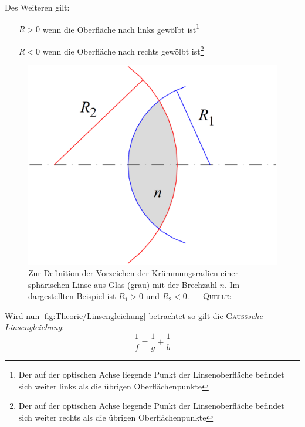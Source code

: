 \documentclass[../protokoll.tex]{subfiles}
\begin{document}
Des Weiteren gilt:
\begin{itemize}[noitemsep,leftmargin=4em]
    \item[$R > 0$] wenn die Oberfläche nach links gewölbt ist\footnote{Der auf der optischen Achse liegende Punkt der Linsenoberfläche befindet sich weiter links als die übrigen Oberflächenpunkte} 
    \item[$R < 0$] wenn die Oberfläche nach rechts gewölbt ist\footnote{Der auf der optischen Achse liegende Punkt der Linsenoberfläche befindet sich weiter rechts als die übrigen Oberflächenpunkte} 
\end{itemize}

\begin{figure}[H]
    \centering
    \includegraphics[width=0.25\linewidth]{2023-05-08 - V4 - Geometrische Optik, optische Abbildung und Aberrationen/images/theory/linsenmacher.png}
    \caption{Zur Definition der Vorzeichen der Krümmungsradien einer sphärischen Linse aus Glas (grau) mit der Brechzahl $n$. Im dargestellten Beispiel ist $R_1 > 0$ und $R_2 < 0$. ---
    \textsc{Quelle}: \cite[S. 44 -- Abb. 2]{script}}
    \label{fig:Theorie/Linsenmacher}
\end{figure}

Wird nun \cref{fig:Theorie/Linsengleichung} betrachtet so gilt die \textsc{Gauß}\textsl{sche Linsengleichung}:
\begin{equation}\label{eq:Gaußsche Linsengleichung}
    \dfrac{1}{f} = \dfrac{1}{g} + \dfrac{1}{b}
\end{equation}
\end{document}
